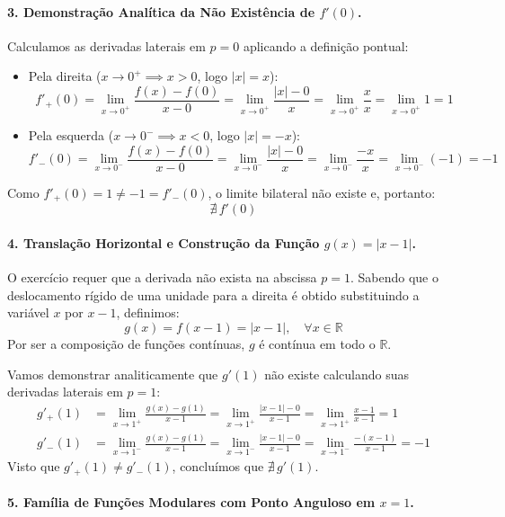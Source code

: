 \paragraph{3. Demonstração Analítica da Não Existência de $f'(0)$.}

Calculamos as derivadas laterais em $p = 0$ aplicando a definição pontual:
\begin{itemize}[leftmargin=*, label=$\bullet$]
    \item Pela direita ($x \to 0^+ \implies x > 0$, logo $|x| = x$):
    \[
    f'_+(0) = \lim_{x \to 0^+} \frac{f(x) - f(0)}{x - 0} = \lim_{x \to 0^+} \frac{|x| - 0}{x} = \lim_{x \to 0^+} \frac{x}{x} = \lim_{x \to 0^+} 1 = 1
    \]

    \item Pela esquerda ($x \to 0^- \implies x < 0$, logo $|x| = -x$):
    \[
    f'_-(0) = \lim_{x \to 0^-} \frac{f(x) - f(0)}{x - 0} = \lim_{x \to 0^-} \frac{|x| - 0}{x} = \lim_{x \to 0^-} \frac{-x}{x} = \lim_{x \to 0^-} (-1) = -1
    \]
\end{itemize}
Como $f'_+(0) = 1 \neq -1 = f'_-(0)$, o limite bilateral não existe e, portanto:
\[
\nexists \, f'(0)
\]

\paragraph{4. Translação Horizontal e Construção da Função $g(x) = |x - 1|$.}

O exercício requer que a derivada não exista na abscissa $p = 1$. Sabendo que o deslocamento rígido de uma unidade para a direita é obtido substituindo a variável $x$ por $x - 1$, definimos:
\[
g(x) = f(x - 1) = |x - 1|, \quad \forall x \in \mathbb{R}
\]
Por ser a composição de funções contínuas, $g$ é contínua em todo o $\mathbb{R}$. 

Vamos demonstrar analiticamente que $g'(1)$ não existe calculando suas derivadas laterais em $p = 1$:
\begin{align*}
g'_+(1) &= \lim_{x \to 1^+} \frac{g(x) - g(1)}{x - 1} = \lim_{x \to 1^+} \frac{|x - 1| - 0}{x - 1} = \lim_{x \to 1^+} \frac{x - 1}{x - 1} = 1 \\
g'_-(1) &= \lim_{x \to 1^-} \frac{g(x) - g(1)}{x - 1} = \lim_{x \to 1^-} \frac{|x - 1| - 0}{x - 1} = \lim_{x \to 1^-} \frac{-(x - 1)}{x - 1} = -1
\end{align*}
Visto que $g'_+(1) \neq g'_-(1)$, concluímos que $\nexists \, g'(1)$.

\paragraph{5. Família de Funções Modulares com Ponto Anguloso em $x = 1$.}

